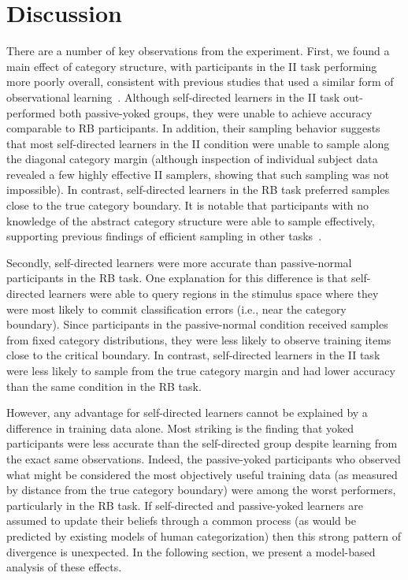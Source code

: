 \documentclass[3p,twocolumn,authoryear,10pt]{elsarticle}
\begin{document}
\section{Discussion}
There are a number of key observations from the experiment. First, we found a main effect of category structure, with participants in the II task performing more poorly overall, consistent with previous studies that used a similar form of observational learning~\citep{Ashby:2002p13331}. Although self-directed learners in the II task out-performed both passive-yoked groups, they were unable to achieve accuracy comparable to RB participants. In addition, their sampling behavior suggests that most self-directed learners in the II condition were unable to sample along the diagonal category margin (although inspection of individual subject data revealed a few highly effective II samplers, showing that such sampling was not impossible). In contrast, self-directed learners in the RB task preferred samples close to the true category boundary. It is notable that participants with no knowledge of the abstract category structure were able to sample effectively, supporting previous findings of efficient sampling in other tasks~\citep{Castro:2008p12850,Oaksford:1994tw}.

Secondly, self-directed learners were more accurate than passive-normal participants in the RB task. One explanation for this difference is that self-directed learners were able to query regions in the stimulus space where they were most likely to commit classification errors (i.e., near the category boundary). Since participants in the passive-normal condition received samples from fixed category distributions, they were less likely to observe training items close to the critical boundary. In contrast, self-directed learners in the II task were less likely to sample from the true category margin and had lower accuracy than the same condition in the RB task.  

However, any advantage for self-directed learners cannot be explained by a difference in training data alone. Most striking is the finding that yoked participants were less accurate than the self-directed group despite learning from the exact same observations. Indeed, the passive-yoked participants who observed what might be considered the most objectively useful training data (as measured by distance from the true category boundary) were among the worst performers, particularly in the RB task. If self-directed and passive-yoked learners are assumed to update their beliefs through a common process (as would be predicted by existing models of human categorization) then this strong pattern of divergence is unexpected. In the following section, we present a model-based analysis of these effects.
\end{document}
